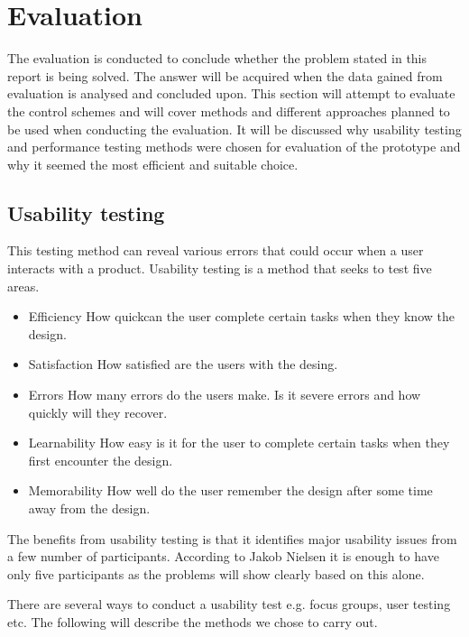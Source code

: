 \section{Evaluation}
The evaluation is conducted to conclude whether the problem stated in this report is being solved. The answer will be acquired when the data gained from evaluation is analysed and concluded upon.
This section will attempt to evaluate the control schemes and will cover methods and different approaches planned to be used when conducting the evaluation. 
It will be discussed why usability testing and performance testing methods were chosen for evaluation of the prototype and why it seemed the most efficient and suitable choice. 

\subsection{Usability testing}

This testing method can reveal various errors that could occur when a user interacts with a product.
Usability testing is a method that seeks to test five areas. \cite{usability}

\begin{itemize}
\item Efficiency
How quickcan the user complete certain tasks when they know the design. \cite{usability}
\item Satisfaction
How satisfied are the users with the desing. \cite{usability}
\item Errors
How many errors do the users make. Is it severe errors and how quickly will they recover. \cite{usability}
\item Learnability
How easy is it for the user to complete certain tasks when they first encounter the design.\cite{usability}
\item Memorability
How well do the user remember the design after some time away from the design. \cite{usability}
\end{itemize}

The benefits from usability testing is that it identifies major usability issues from a few number of participants. \cite{usability}
According to Jakob Nielsen it is enough to have only five participants as the problems will show clearly based on this alone. \cite{usability}

There are several ways to conduct a usability test e.g. focus groups, user testing etc.
The following will describe the methods we chose to carry out.

